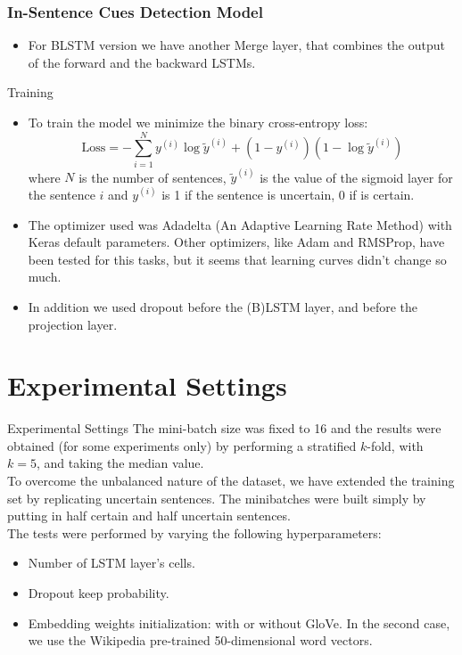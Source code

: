 \documentclass{beamer}
\begin{document}
\begin{frame}[shrink=25]
	\frametitle{In-Sentence Cues Detection Model}
	\vspace{30px}
	\begin{figure}[htbp]
		
	\end{figure}
	\begin{itemize}
		\item For BLSTM version we have another Merge layer, that combines the output of the forward and the backward LSTMs.
	\end{itemize}
\end{frame}
\begin{frame}{Training}
	\begin{itemize}\setlength\itemsep{1em}
		\item To train the model we minimize the binary cross-entropy loss:
		$$\text{Loss} = -\sum_{i=1}^{N}y^{(i)}\log\widetilde{y}^{(i)} + \left(1-y^{(i)}\right)\left(1-\log\widetilde{y}^{(i)}\right)$$
		where $N$ is the number of sentences, $\widetilde{y}^{(i)}$ is the value of the sigmoid layer for the sentence $i$ and $y^{(i)}$ is 1 if the sentence is uncertain, 0 if is certain.
		\item The optimizer used was Adadelta (An Adaptive Learning Rate Method) with Keras default parameters. Other optimizers, like Adam and RMSProp, have been tested for this tasks, but it seems that learning curves didn't change so much.
		\item In addition we used dropout before the (B)LSTM layer, and before the projection layer.
	\end{itemize}
\end{frame}

\section{Experimental Settings}
\begin{frame}{Experimental Settings}
	The mini-batch size was fixed to 16 and the results were obtained (for some experiments only) by performing a stratified $k$-fold, with $k=5$, and taking the median value.\\
	\vspace{0.5cm}
	To overcome the unbalanced nature of the dataset, we have extended the training set by replicating uncertain sentences. The minibatches were built simply by putting in half certain and half uncertain sentences.\\
	\vspace{0.5cm}
	The tests were performed by varying the following hyperparameters:
	\begin{itemize}
		\item Number of LSTM layer's cells.
		\item Dropout keep probability.
		\item Embedding weights initialization: with or without GloVe. In the second case, we use the Wikipedia pre-trained 50-dimensional word vectors.
	\end{itemize}
\end{frame}
\end{document}

